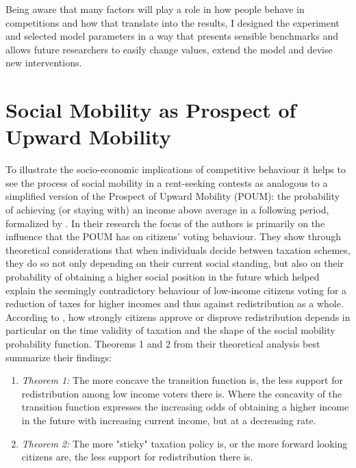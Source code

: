Being aware that many factors will play a role in how people behave in competitions and how that translate into the results, I designed the experiment and selected model parameters in a way that presents sensible benchmarks and allows future researchers to easily change values, extend the model and devise new interventions.\\ 

\section{Social Mobility as Prospect of Upward Mobility}
\label{sec:poum}
 
To illustrate the socio-economic implications of competitive behaviour it helps to see the process of social mobility in a rent-seeking contests as analogous to a simplified version of the Prospect of Upward Mobility (POUM): the probability of achieving (or staying with) an income above average in a following period, formalized by \cite{benabou2001}. In their research the focus of the authors is primarily on the influence that the POUM has on citizens' voting behaviour. They show through theoretical considerations that when individuals decide between taxation schemes, they do so not only depending on their current social standing, but also on their probability of obtaining a higher social position in the future which helped explain the seemingly contradictory behaviour of low-income citizens voting for a reduction of taxes for higher incomes and thus against redistribution as a whole.\\

According to \citeauthor{benabou2001}, how strongly citizens approve or disprove redistribution depends in particular on the time validity of taxation and the shape of the social mobility probability function. Theorems 1 and 2 from their theoretical analysis best summarize their findings:\\
\begin{enumerate}
    \item \textit{Theorem 1:} The more concave the transition function is, the less support for redistribution among low income voters there is. Where the concavity of the transition function expresses the increasing odds of obtaining a higher income in the future with increasing current income, but at a decreasing rate.  
    \item \textit{Theorem 2:} The more "sticky" taxation policy is, or the more forward looking citizens are, the less support for redistribution there is.
\end{enumerate}


